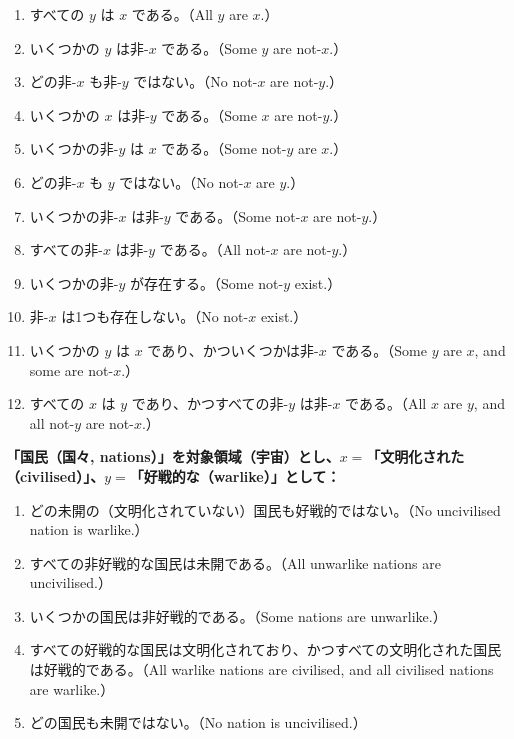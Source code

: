 \documentclass[a4paper,11pt,openany]{ltjsbook}
\begin{document}
\begin{enumerate}[label=\textbf{\arabic*.}]
\item すべての $y$ は $x$ である。（All $y$ are $x$.）
\item いくつかの $y$ は非-$x$ である。（Some $y$ are not-$x$.）
\item どの非-$x$ も非-$y$ ではない。（No not-$x$ are not-$y$.）
\item いくつかの $x$ は非-$y$ である。（Some $x$ are not-$y$.）
\item いくつかの非-$y$ は $x$ である。（Some not-$y$ are $x$.）
\item どの非-$x$ も $y$ ではない。（No not-$x$ are $y$.）
\item いくつかの非-$x$ は非-$y$ である。（Some not-$x$ are not-$y$.）
\item すべての非-$x$ は非-$y$ である。（All not-$x$ are not-$y$.）
\item いくつかの非-$y$ が存在する。（Some not-$y$ exist.）
\item 非-$x$ は1つも存在しない。（No not-$x$ exist.）
\item いくつかの $y$ は $x$ であり、かついくつかは非-$x$ である。（Some $y$ are $x$, and some are not-$x$.）
\item すべての $x$ は $y$ であり、かつすべての非-$y$ は非-$x$ である。（All $x$ are $y$, and all not-$y$ are not-$x$.）
\end{enumerate}

\noindent\textbf{「国民（国々, nations）」を対象領域（宇宙）とし、$x=$「文明化された（civilised）」、$y=$「好戦的な（warlike）」として：}
\begin{enumerate}[label=\textbf{\arabic*.}, start=13]
\item どの未開の（文明化されていない）国民も好戦的ではない。（No uncivilised nation is warlike.）
\item すべての非好戦的な国民は未開である。（All unwarlike nations are uncivilised.）
\item いくつかの国民は非好戦的である。（Some nations are unwarlike.）
\item すべての好戦的な国民は文明化されており、かつすべての文明化された国民は好戦的である。（All warlike nations are civilised, and all civilised nations are warlike.）
\item どの国民も未開ではない。（No nation is uncivilised.）
\end{enumerate}
\end{document}
